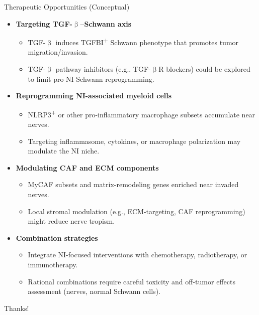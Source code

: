 \documentclass[10pt]{beamer}
\theoremstyle{plain}
\begin{document}
\begin{frame}{Therapeutic Opportunities (Conceptual)}
  \begin{itemize}
    \item \textbf{Targeting TGF-\(\upbeta\)–Schwann axis}
      \begin{itemize}
        \item TGF-\(\upbeta\) induces TGFBI\textsuperscript{+} Schwann phenotype that promotes tumor migration/invasion.
        \item TGF-\(\upbeta\) pathway inhibitors (e.g., TGF-\(\upbeta\)R blockers) could be explored to limit pro-NI Schwann reprogramming.
      \end{itemize}
    \item \textbf{Reprogramming NI-associated myeloid cells}
      \begin{itemize}
        \item NLRP3\textsuperscript{+} or other pro-inflammatory macrophage subsets accumulate near nerves.
        \item Targeting inflammasome, cytokines, or macrophage polarization may modulate the NI niche.
      \end{itemize}
    \item \textbf{Modulating CAF and ECM components}
      \begin{itemize}
        \item MyCAF subsets and matrix-remodeling genes enriched near invaded nerves.
        \item Local stromal modulation (e.g., ECM-targeting, CAF reprogramming) might reduce nerve tropism.
      \end{itemize}
    \item \textbf{Combination strategies}
      \begin{itemize}
        \item Integrate NI-focused interventions with chemotherapy, radiotherapy, or immunotherapy.
        \item Rational combinations require careful toxicity and off-tumor effects assessment (nerves, normal Schwann cells).
      \end{itemize}
  \end{itemize}
\end{frame}

\begin{frame}
    \begin{center}
        {\Huge\calligra Thanks!}
    \end{center}
\end{frame}
\end{document}
